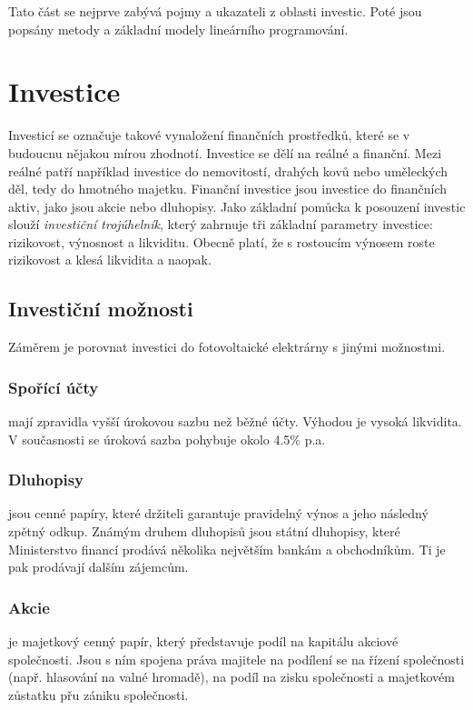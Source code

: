 Tato část se nejprve zabývá pojmy a ukazateli z oblasti investic.
Poté jsou popsány metody a základní modely lineárního programování.

\section{Investice}


Investicí se označuje takové vynaložení finančních prostředků, které se v budoucnu nějakou mírou zhodnotí.
Investice se dělí na reálné a finanční. Mezi reálné patří například investice do nemovitostí, drahých kovů nebo uměleckých děl, tedy do hmotného majetku.
Finanční investice jsou investice do finančních aktiv, jako jsou akcie nebo dluhopisy.
Jako základní pomůcka k posouzení investic slouží \textit{investiční trojúhelník}, který zahrnuje tři základní parametry investice: rizikovost, výnosnost a likviditu.
Obecně platí, že s rostoucím výnosem roste rizikovost a klesá likvidita a naopak.

\subsection{Investiční možnosti}

Záměrem je porovnat investici do fotovoltaické elektrárny s jinými možnostmi.


\subsubsection{Spořící účty}
mají zpravidla vyšší úrokovou sazbu než běžné účty.
Výhodou je vysoká likvidita.
V současnosti se úroková sazba pohybuje okolo 4.5\% p.a.

\subsubsection{Dluhopisy} jsou cenné papíry,
které držiteli garantuje pravidelný výnos a jeho následný zpětný odkup.
Známým druhem dluhopisů jsou státní dluhopisy, které Ministerstvo financí prodává několika největším bankám a obchodníkům.
Ti je pak prodávají dalším zájemcům.


\subsubsection{Akcie}
je majetkový cenný papír, který představuje podíl na kapitálu akciové společnosti.
Jsou s ním spojena práva majitele na podílení se na řízení společnosti (např. hlasování na valné hromadě),
na podíl na zisku společnosti a majetkovém zůstatku přu zániku společnosti.


